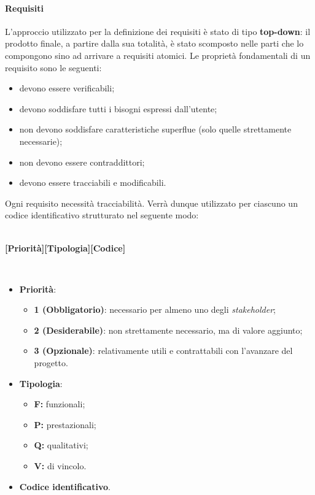 \paragraph{Requisiti}
L'approccio utilizzato per la definizione dei requisiti è stato di tipo \textbf{top-down}: il prodotto finale, a partire dalla sua totalità, è stato scomposto nelle parti che lo compongono sino ad arrivare a requisiti atomici. Le proprietà fondamentali di un requisito sono le seguenti:
\begin{itemize}
	\item devono essere verificabili;
	\item devono soddisfare tutti i bisogni espressi dall'utente;
	\item non devono soddisfare caratteristiche superflue (solo quelle strettamente necessarie);
	\item non devono essere contraddittori;
	\item devono essere tracciabili e modificabili.
\end{itemize}  
\noindent Ogni requisito necessità tracciabilità. Verrà dunque utilizzato per ciascuno un codice identificativo strutturato nel seguente modo:
\\\\
\centerline{\textbf{[Priorità][Tipologia][Codice]}}\\
\begin{itemize}
  \item \textbf{Priorità}:
  \begin{itemize}
    \item \textbf{1 (Obbligatorio)}: necessario per almeno uno degli \textit{stakeholder\glos};
    \item \textbf{2 (Desiderabile)}: non strettamente necessario, ma di valore aggiunto;
    \item \textbf{3 (Opzionale)}: relativamente utili e contrattabili con l'avanzare del progetto.
  \end{itemize}
  \item \textbf{Tipologia}:
  \begin{itemize}
    \item \textbf{F:} funzionali;
    \item \textbf{P:} prestazionali;
    \item \textbf{Q:} qualitativi;
    \item \textbf{V:} di vincolo.
  \end{itemize}
  \item \textbf{Codice identificativo}.
\end{itemize}
